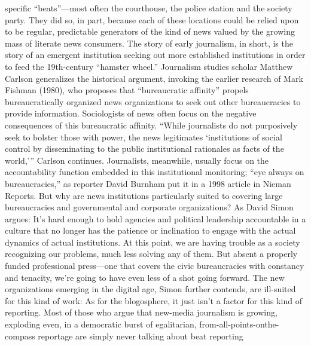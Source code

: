 specific ``beats''—most often the courthouse, the police station and the society
party. They did so, in part, because each of these locations could be relied upon to
be regular, predictable generators of the kind of news valued by the growing mass
of literate news consumers. The story of early journalism, in short, is the story of
an emergent institution seeking out more established institutions in order to feed
the 19th-century ``hamster wheel.'' Journalism studies scholar Matthew Carlson
generalizes the historical argument, invoking the earlier research of Mark Fishman
(1980), who proposes that ``bureaucratic affinity'' propels bureaucratically organized
news organizations to seek out other bureaucracies to provide information.
Sociologists of news often focus on the negative consequences of this bureaucratic
affinity. ``While journalists do not purposively seek to bolster those with
power, the news legitimates ‘institutions of social control by disseminating to the
public institutional rationales as facts of the world,’'' Carlson continues. Journalists,
meanwhile, usually focus on the accountability function embedded in this
institutional monitoring; ``eye always on bureaucracies,'' as reporter David Burnham
put it in a 1998 article in Nieman Reports.
But why are news institutions particularly suited to covering large bureaucracies
and governmental and corporate organizations? As David Simon argues:
It’s hard enough to hold agencies and political leadership accountable
in a culture that no longer has the patience or inclination to engage
with the actual dynamics of actual institutions. At this point, we are
having trouble as a society recognizing our problems, much less solving
any of them. But absent a properly funded professional press—one that
covers the civic bureaucracies with constancy and tenacity, we’re going
to have even less of a shot going forward.
The new organizations emerging in the digital age, Simon further contends, are
ill-suited for this kind of work:
As for the blogosphere, it just isn’t a factor for this kind of reporting.
Most of those who argue that new-media journalism is growing, exploding
even, in a democratic burst of egalitarian, from-all-points-onthe-
compass reportage are simply never talking about beat reporting

